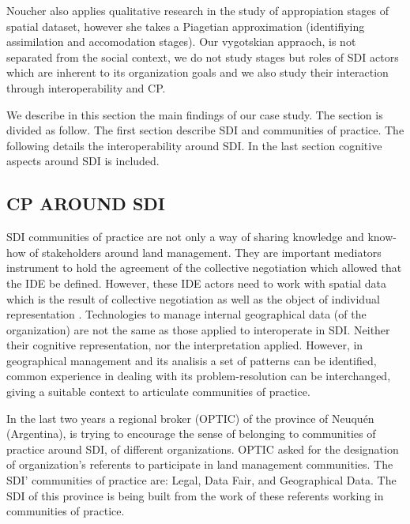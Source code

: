 \documentclass[10pt,twocolumn,ieeetran]{article}
\begin{document}
Noucher \cite{Noucher1} also applies qualitative research in the study of appropiation stages of spatial dataset, however she takes a Piagetian approximation (identifiying assimilation and accomodation stages). 
Our vygotskian appraoch, is not separated from the social context, we do not study stages but roles of SDI actors which are inherent to its organization goals and we also study their interaction through interoperability and CP.


We describe in this section the main findings of our case study. The section is divided as follow. The first section describe SDI and communities of practice. The following details the interoperability around SDI. In the last section cognitive aspects around SDI is included.
 

\subsection{CP AROUND SDI}


SDI communities of practice are not only a way of sharing knowledge and know-how of stakeholders around land management. They are important mediators instrument to hold the agreement of the collective negotiation which allowed that the IDE be defined. However, these IDE actors need to work with spatial data which is the result of collective negotiation as well as the object of individual representation \cite{Noucher1}. Technologies to manage internal geographical data (of the organization) are not the same as those applied to interoperate in SDI. Neither their cognitive representation, nor the interpretation applied. However, in geographical management and its analisis a set of patterns can be identified, common experience in dealing with its problem-resolution can be interchanged, giving a suitable context to articulate communities of practice.  

In the last two years a regional broker (OPTIC) of the province of Neuqu\' en (Argentina), is trying to encourage the sense of belonging to communities of practice around SDI, of different organizations.
OPTIC asked for the designation of organization's referents to participate in land management communities. The SDI' communities of practice are: Legal, Data Fair, and Geographical Data. The SDI of this province is being built from the work of these referents working in communities of practice.
\end{document}
